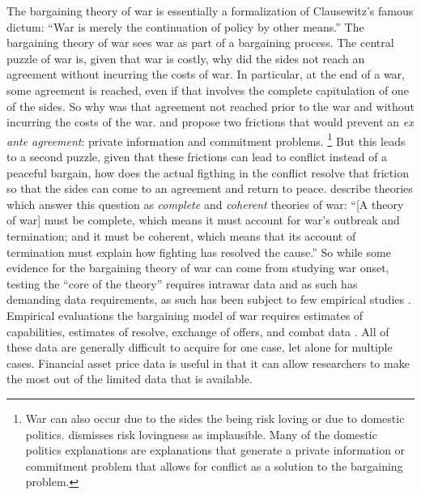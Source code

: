 The bargaining theory of war is essentially a formalization of Clausewitz's famous dictum: ``War is merely the continuation of policy by other means.'' \parencite[87]{Clausewitz1989}
The bargaining theory of war sees war as part of a bargaining process.
The central puzzle of war is, given that war is costly, why did the sides not reach an agreement without incurring the costs of war.
In particular, at the end of a war, some agreement is reached, even if that involves the complete capitulation of one of the sides.
So why was that agreement not reached prior to the war and without incurring the costs of the war.
\parencite{Fearon1995} and \parencite{Powell2006} propose two frictions that would prevent an \textit{ex ante agreement}: private information and commitment problems.%
\footnote{
  War can also occur due to the sides the being risk loving or due to domestic politics.
  \textcite{Fearon1995} dismisses risk lovingness as implausible.
  Many of the domestic politics explanations are explanations that generate a private information or commitment problem that allows for conflict as a solution to the bargaining problem.
}
But this leads to a second puzzle, given that these frictions can lead to conflict instead of a peaceful bargain, how does the actual figthing in the conflict resolve that friction so that the sides can come to an agreement and return to peace.
\textcite[757]{LeventogluSlantchev2007} describe theories which answer this question as \textit{complete} and \textit{coherent} theories of war: ``[A theory of war] must be complete, which means it must account for war’s outbreak and termination; and it must be coherent, which means that its account of termination must explain how fighting has resolved the cause.''
So while some evidence for the bargaining theory of war can come from studying war onset, testing the ``core of the theory'' requires intrawar data and as such has demanding data requirements, as such has been subject to few empirical studies \parencites{Reiter2003}{Ramsay2008}{Reiter2009}{Weisiger2015}.
Empirical evaluations the bargaining model of war requires estimates of capabilities, estimates of resolve, exchange of offers, and combat data \parencite{Reiter2003}.
All of these data are generally difficult to acquire for one case, let alone for multiple cases.
Financial asset price data is useful in that it can allow researchers to make the most out of the limited data that is available.

